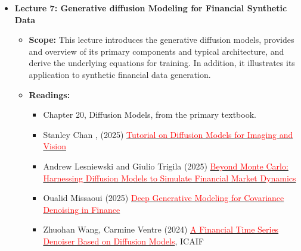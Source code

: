 \documentclass[11pt]{article}
\begin{document}
\begin{itemize}
\item \textbf{Lecture 7: Generative diffusion Modeling for Financial Synthetic Data}
  \begin{itemize}
    \item \textbf{Scope:} This lecture introduces the generative diffusion models,
      provides and overview of its primary components and typical architecture, and
      derive the underlying equations for training. In addition, it illustrates its
      application to synthetic financial data generation.
    \item \textbf{Readings:}
      \begin{itemize}
        \item Chapter 20, Diffusion Models, from the primary textbook.
        \item Stanley Chan , (2025) \href{https://arxiv.org/pdf/2403.18103}{\textcolor{red}{Tutorial on Diffusion Models for Imaging and Vision}}
        \item Andrew Lesniewski and Giulio Trigila (2025) \href{https://arxiv.org/pdf/2412.00036}{\textcolor{red}{Beyond Monte Carlo: Harnessing Diffusion Models to Simulate Financial Market Dynamics}}
        \item Oualid Missaoui (2025) \href{https://papers.ssrn.com/sol3/papers.cfm?abstract_id=5517384}{\textcolor{red}{Deep Generative Modeling for Covariance Denoising in Finance}}
        \item Zhuohan Wang, Carmine Ventre (2024) \href{https://kclpure.kcl.ac.uk/ws/portalfiles/portal/313573729/A_Financial_Time_Series_Denoiser_Based_on_Diffusion_Model_ICAIF2024.pdf}{\textcolor{red}{A Financial Time Series Denoiser Based on Diffusion Models}}, ICAIF
      \end{itemize}
  \end{itemize}


\end{itemize}
\end{document}
